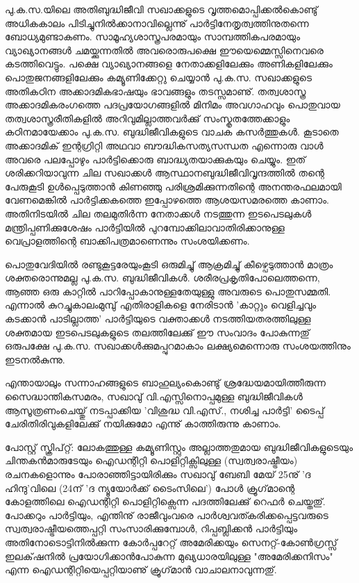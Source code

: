 പു.ക.സ.യിലെ അതിബുദ്ധിജീവി സഖാക്കളുടെ വൃത്തമൊപ്പിക്കല്‍കൊണ്ടു് അധികകാലം പിടിച്ചുനില്‍ക്കാനാവില്ലെന്നു് 
പാര്‍ട്ടിനേതൃത്വത്തിനുതന്നെ ബോധ്യമുണ്ടാകണം. സാമൂഹ്യശാസ്ത്രപരമായും സാമ്പത്തികപരമായും 
വ്യാഖ്യാനങ്ങള്‍ ചമയ്ക്കുന്നതില്‍ അവരൊരുപക്ഷെ ഈയെമ്മെസ്സിനെവരെ കടത്തിവെട്ടും. പക്ഷെ വ്യാഖ്യാനങ്ങളെ നേതാക്കളിലേക്കും 
അണികളിലേക്കും പൊതുജനങ്ങളിലേക്കും കമ്യൂണിക്കേറ്റു ചെയ്യാന്‍ പു.ക.സ. സഖാക്കളുടെ അതികഠിന അക്കാദമികഭാഷയും
ഭാവങ്ങളും തടസ്സമാണു്. തത്വശാസ്ത്ര അക്കാദമികരംഗത്തെ പദപ്രയോഗങ്ങളില്‍ മിനിമം അവഗാഹവും പൊതുവായ 
തത്വശാസ്ത്രരീതികളില്‍ അറിവുമില്ലാത്തവര്‍ക്കു് സംസ്കൃതത്തേക്കാളും കഠിനമായേക്കാം പു.ക.സ. ബുദ്ധിജീവികളുടെ വാചക
കസര്‍ത്തുകള്‍. കൂടാതെ അക്കാദമിക് ഇന്റഗ്രിറ്റി അഥവാ ബൗദ്ധികസത്യസന്ധത എന്നൊരു വാള്‍ അവരെ പലപ്പോഴും 
പാര്‍ട്ടിക്കൊരു ബാദ്ധ്യതയാക്കുകയും ചെയ്യും. ഇത് ശരിക്കറിയാവുന്ന ചില സഖാക്കള്‍ ആസ്ഥാനബുദ്ധിജീവിവൃന്ദത്തില്‍ 
തന്റെ പേരുകൂടി ഉള്‍പ്പെടുത്താന്‍ കിണഞ്ഞു പരിശ്രമിക്കുന്നതിന്റെ അനന്തരഫലമായി വേണമെങ്കില്‍ പാര്‍ട്ടിക്കകത്തെ ഇപ്പോഴത്തെ
ആശയസമരത്തെ കാണാം. അതിനിടയില്‍ ചില തലമുതിര്‍ന്ന നേതാക്കള്‍ നടത്തുന്ന ഇടപെടലുകള്‍ മന്ത്രിപ്പണിക്കുശേഷം
പാര്‍ട്ടിയില്‍ പുറമ്പോക്കിലാവാതിരിക്കാനുള്ള വെപ്രാളത്തിന്റെ ബാക്കിപത്രമാണെന്നും സംശയിക്കണം.

പൊതുവേദിയില്‍ രണ്ടുകൂട്ടരേയുംകൂടി ഒരുമിച്ചു് ആക്രമിച്ചു് കീഴ്പെടുത്താന്‍ മാത്രം ശക്തരൊന്നുമല്ല പു.ക.സ. ബുദ്ധിജീവികള്‍. 
ശരീരപ്രകൃതിപോലെത്തന്നെ, ആഞ്ഞ ഒരു കാറ്റില്‍ പാറിപ്പോകാനുള്ളതേയുള്ളു അവരുടെ പൊതുസമ്മതി. എന്നാല്‍ കുറച്ചുകാലംമുമ്പു് 
എതിരാളികളെ നേരിടാന്‍ 'കാറ്റും വെളിച്ചവും കടക്കാന്‍ പാടില്ലാത്ത' പാര്‍ട്ടിയുടെ വക്താക്കള്‍ 
നടത്തിയതരത്തിലുള്ള ശക്തമായ ഇടപെടലുകളുടെ തലത്തിലേക്കു് ഈ സംവാദം പോകുന്നതു് ഒരുപക്ഷേ പു.ക.സ. 
സഖാക്കള്‍ക്കുമപ്പുറമാകാം ലക്ഷ്യമെന്നൊരു സംശയത്തിനും ഇടനല്‍കുന്നു.

എന്തായാലും സന്നാഹങ്ങളുടെ ബാഹുല്യംകൊണ്ടു് ശ്രദ്ധേയമായിത്തീരുന്ന സൈദ്ധാന്തികസമരം, സഖാവു് വി.എസ്സിനൊപ്പമുള്ള 
ബുദ്ധിജീവികള്‍ ആസൂത്രണംചെയ്തു് നടപ്പാക്കിയ 'വിശുദ്ധ വി.എസ്., നശിച്ച പാര്‍ട്ടി' ടൈപ്പ് ചേരിതിരിവുകളിലേക്കു് 
നയിക്കുമോ എന്നു് കാത്തിരുന്നു കാണാം.

പോസ്റ്റ് സ്ക്രിപ്റ്റ്: ലോകത്തുള്ള കമ്യൂണിസ്റ്റും അല്ലാത്തതുമായ ബുദ്ധിജീവികളുടെയും ചിന്തകന്‍മാരുടേയും ഐഡന്റിറ്റി 
പൊളിറ്റിക്സിലുള്ള (സ്വത്വരാഷ്ട്രീയം) രചനകളൊന്നും പോരാഞ്ഞിട്ടായിരിക്കും സഖാവു് ബേബി മേയ് 25നു് 'ദ ഹിന്ദു'വിലെ 
(24ന് 'ദ ന്യൂയോര്‍ക്ക് ടൈംസിലെ') പോള്‍ ക്രൂഗ്‌മാന്റെ കോളത്തിലെ ഐഡന്റിറ്റി പൊളിറ്റിക്സെന്ന പദത്തിലേക്കു് 
റെഫര്‍ ചെയ്തതു്. പോക്കറും പാര്‍ട്ടിയും, എന്തിനു് രാജീവുംവരെ പാര്‍ശ്വവത്കരിക്കപ്പെട്ടവരുടെ സ്വത്വരാഷ്ട്രീയത്തെപ്പറ്റി 
സംസാരിക്കുമ്പോള്‍, റിപ്പബ്ലിക്കന്‍ പാര്‍ട്ടിയും അതിനോടൊട്ടിനില്‍ക്കുന്ന കോര്‍പ്പറേറ്റ് അമേരിക്കയും സെനറ്റ്-കോണ്‍ഗ്രസ്സ് ഇലക്‌ഷനില്‍ 
പ്രയോഗിക്കാന്‍പോകുന്ന മുഖ്യധാരയിലുള്ള "അമേരിക്കനിസം" എന്ന ഐഡന്റിറ്റിയെപ്പറ്റിയാണു് ക്രൂഗ്‌മാന്‍ വാചാലനാവുന്നതു്.

